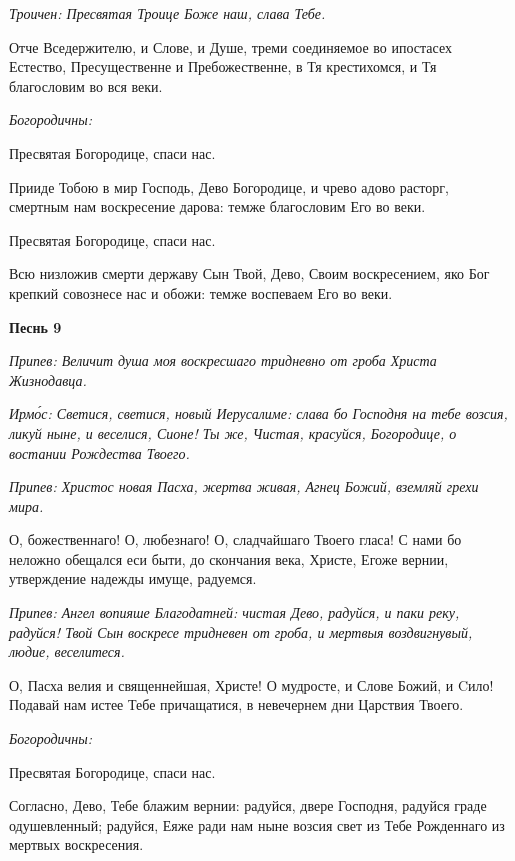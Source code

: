 \itshape Троичен:\normalfont{} Пресвятая Троице Боже наш, слава Тебе.


Отче Вседержителю, и Слове, и Душе, треми соединяемое во ипостасех Естество, Пресущественне и Пребожественне, в Тя крестихомся, и Тя благословим во вся веки.


\itshape Богородичны:

\normalfont{}


Пресвятая Богородице, спаси нас.


Прииде Тобою в мир Господь, Дево Богородице, и чрево адово расторг, смертным нам воскресение дарова: темже благословим Его во веки.


Пресвятая Богородице, спаси нас.


Всю низложив смерти державу Сын Твой, Дево, Своим воскресением, яко Бог крепкий совознесе нас и обожи: темже воспеваем Его во веки.





\bfseries Песнь 9\normalfont{}


\itshape Припев:\normalfont{} Величит душа моя воскресшаго тридневно от гроба Христа Жизнодавца.


\itshape Ирмо́с:\normalfont{} Светися, светися, новый Иерусалиме: слава бо Господня на тебе возсия, ликуй ныне, и веселися, Сионе! Ты же, Чистая, красуйся, Богородице, о востании Рождества Твоего.


\itshape Припев:\normalfont{} Христос новая Пасха, жертва живая, Агнец Божий, вземляй грехи мира.


О, божественнаго! О, любезнаго! О, сладчайшаго Твоего гласа! С нами бо неложно обещался еси быти, до скончания века, Христе, Егоже вернии, утверждение надежды имуще, радуемся.


\itshape Припев:\normalfont{} Ангел вопияше Благодатней: чистая Дево, радуйся, и паки реку, радуйся! Твой Сын воскресе тридневен от гроба, и мертвыя воздвигнувый, людие, веселитеся.


О, Пасха велия и священнейшая, Христе! О мудросте, и Слове Божий, и Cило! Подавай нам истее Тебе причащатися, в невечернем дни Царствия Твоего.


\itshape Богородичны:

\normalfont{}


Пресвятая Богородице, спаси нас.


Согласно, Дево, Тебе блажим вернии: радуйся, двере Господня, радуйся граде одушевленный; радуйся, Еяже ради нам ныне возсия свет из Тебе Рожденнаго из мертвых воскресения.


